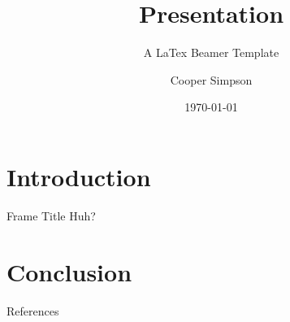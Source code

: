 \documentclass{presentation}
\title{Presentation}
\subtitle{A LaTex Beamer Template}
\institute{Institute of Stufff}
\author{Cooper Simpson}
\date{\today}
\begin{document}
	
	\begin{frame}[plain]
	    \maketitle
	\end{frame}

	\section{Introduction}
	
	\begin{frame}{Frame Title}
		Huh?
	\end{frame}

	\section{Conclusion}

	\begin{frame}[allowframebreaks]{References}
	\end{frame}
\end{document}
